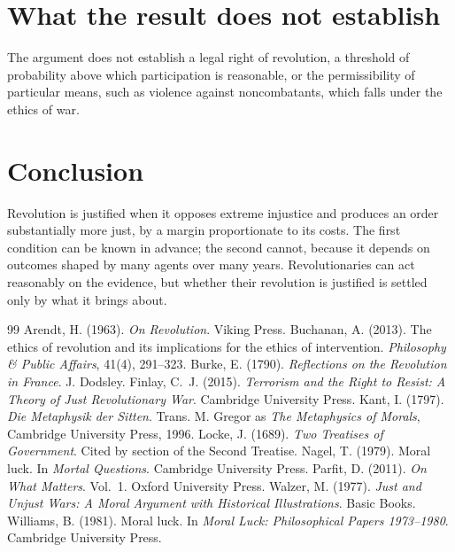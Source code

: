 \documentclass{situationist-preprint}
\begin{document}
\section{What the result does not establish}

The argument does not establish a legal right of revolution, a threshold of probability above which participation is reasonable, or the permissibility of particular means, such as violence against noncombatants, which falls under the ethics of war.

\section{Conclusion}

Revolution is justified when it opposes extreme injustice and produces an order substantially more just, by a margin proportionate to its costs. The first condition can be known in advance; the second cannot, because it depends on outcomes shaped by many agents over many years. Revolutionaries can act reasonably on the evidence, but whether their revolution is justified is settled only by what it brings about.

\begin{thebibliography}{99}\small
{} Arendt, H. (1963). \emph{On Revolution}. Viking Press.
 Buchanan, A. (2013). The ethics of revolution and its implications for the ethics of intervention. \emph{Philosophy \& Public Affairs}, 41(4), 291--323.
 Burke, E. (1790). \emph{Reflections on the Revolution in France}. J. Dodsley.
 Finlay, C.~J. (2015). \emph{Terrorism and the Right to Resist: A Theory of Just Revolutionary War}. Cambridge University Press.
 Kant, I. (1797). \emph{Die Metaphysik der Sitten}. Trans. M. Gregor as \emph{The Metaphysics of Morals}, Cambridge University Press, 1996.
 Locke, J. (1689). \emph{Two Treatises of Government}. Cited by section of the Second Treatise.
 Nagel, T. (1979). Moral luck. In \emph{Mortal Questions}. Cambridge University Press.
 Parfit, D. (2011). \emph{On What Matters}. Vol.~1. Oxford University Press.
 Walzer, M. (1977). \emph{Just and Unjust Wars: A Moral Argument with Historical Illustrations}. Basic Books.
 Williams, B. (1981). Moral luck. In \emph{Moral Luck: Philosophical Papers 1973--1980}. Cambridge University Press.
\end{thebibliography}
\end{document}
